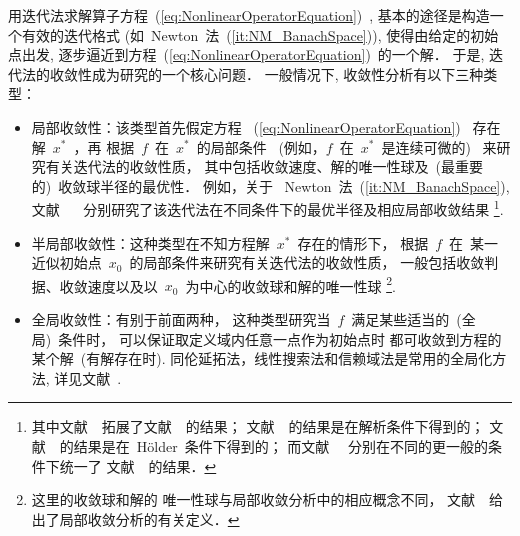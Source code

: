 用迭代法求解算子方程~(\ref{eq:NonlinearOperatorEquation})~,
基本的途径是构造一个有效的迭代格式
(如~Newton~法~(\ref{it:NM_BanachSpace})),  使得由给定的初始点出发,
逐步逼近到方程~(\ref{eq:NonlinearOperatorEquation})~的一个解． 于是,
迭代法的收敛性成为研究的一个核心问题． 一般情况下,
收敛性分析有以下三种类型：
\begin{itemize}
\item[1)]
局部收敛性：该类型首先假定方程
~(\ref{eq:NonlinearOperatorEquation})~ 存在解~$x^*$~，再
根据~$f$~在~$x^*$~的局部条件 ~(例如，$f$~在~$x^*$~是连续可微的)~
来研究有关迭代法的收敛性质，
其中包括收敛速度、解的唯一性球及~(最重要的)~收敛球半径的最优性．
例如，关于 ~Newton~法~(\ref{it:NM_BanachSpace}), 文献
~\cite{Traub1979,Ypma1982,Smale1986,Wang2000a,Huang2004,Proinov2009,Ferreira2009b}~
分别研究了该迭代法在不同条件下的最优半径及相应局部收敛结果
\footnote{其中文献~\cite{Ypma1982}~拓展了文献~\cite{Traub1979}~的结果；
文献~\cite{Smale1986}~的结果是在解析条件下得到的；
文献~\cite{Huang2004}~的结果是在~H\"{o}lder~条件下得到的；
而文献~\cite{Wang2000a,Proinov2009,Ferreira2009b}~
分别在不同的更一般的条件下统一了
文献~\cite{Traub1979,Ypma1982,Smale1986}~的结果．}.
\item[2)]
半局部收敛性：这种类型在不知方程解~$x^*$~存在的情形下，
根据~$f$~在~某一近似初始点~$x_0$~的局部条件来研究有关迭代法的收敛性质，
一般包括收敛判据、收敛速度以及以~$x_0$~为中心的收敛球和解的唯一性球
\footnote{这里的收敛球和解的
唯一性球与局部收敛分析中的相应概念不同，
文献~\cite{Huang2004}~给出了局部收敛分析的有关定义．}.
\item[3)]
全局收敛性：有别于前面两种，
这种类型研究当~$f$~满足某些适当的~(全局)~条件时，
可以保证取定义域内任意一点作为初始点时
都可收敛到方程的某个解~(有解存在时).
同伦延拓法，线性搜索法和信赖域法是常用的全局化方法,
详见文献~\cite{Ortega1970,Dennis1996,Deuflhard2004}.
\end{itemize}


